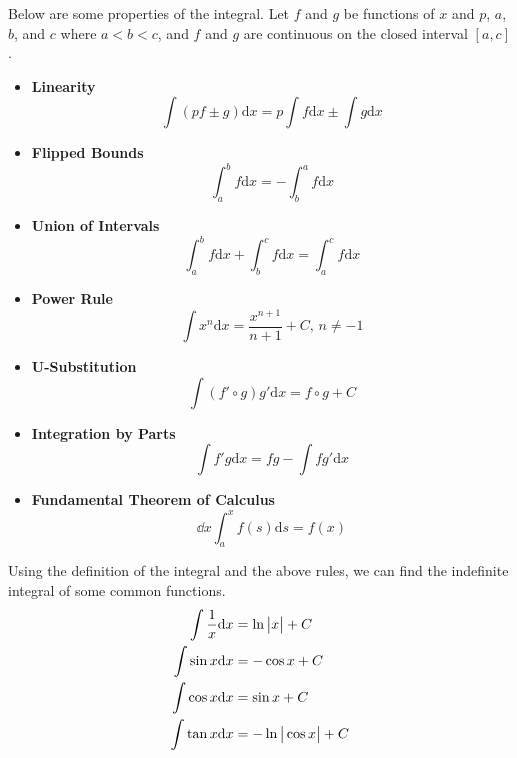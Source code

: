 \noindent
Below are some properties of the integral. Let $f$ and $g$ be functions of $x$ and $p$, $a$, $b$, and $c$ where $a < b < c$, and $f$ and $g$ are continuous on the closed interval $[a,c]$.
\begin{itemize}
	\item \textbf{Linearity}
	\begin{equation*}
		\int{(pf \pm g) \mathrm{d}x} = p\int{f \mathrm{d}x} \pm \int{g \mathrm{d}x}
	\end{equation*}
	\item \textbf{Flipped Bounds}
	\begin{equation*}
		\int_{a}^{b}{f \mathrm{d}x} = -\int_{b}^{a}{f \mathrm{d}x}
	\end{equation*}
	\item \textbf{Union of Intervals}
	\begin{equation*}
		\int_{a}^{b}{f \mathrm{d}x} + \int_{b}^{c}{f \mathrm{d}x} = \int_{a}^{c}{f \mathrm{d}x}
	\end{equation*}
	\item \textbf{Power Rule}
	\begin{equation*}
		\int{x^n \mathrm{d}x} = \frac{x^{n+1}}{n+1} + C \text{, }n \neq -1
	\end{equation*}
	\item \textbf{U-Substitution}
	\begin{equation*}
		\int{\left(f'\circ g\right) g' \mathrm{d}x} = f\circ g+ C
	\end{equation*}
	\item \textbf{Integration by Parts}
	\begin{equation*}
		\int{f' g \mathrm{d}x} = fg - \int{fg' \mathrm{d}x}
	\end{equation*}
	\item \textbf{Fundamental Theorem of Calculus}
	\begin{equation*}
		\dd{}{x}\int_{a}^{x}{f(s) \mathrm{d}s} = f(x)
	\end{equation*}
\end{itemize}
Using the definition of the integral and the above rules, we can find the indefinite integral of some common functions.
\begin{align*}
	\int{\frac{1}{x} \mathrm{d}x} &= \ln{\big\lvert x \big\rvert} + C \\
	\int{\sin{x} \mathrm{d}x} &= -\cos{x} + C \\
	\int{\cos{x} \mathrm{d}x} &= \sin{x} + C \\
	\int{\tan{x} \mathrm{d}x} &= -\ln{\big\lvert \cos{x} \big\rvert} + C
\end{align*}